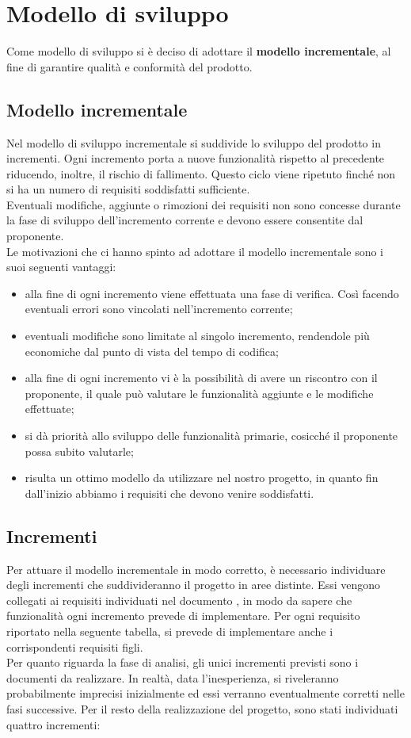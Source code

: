 \section{Modello di sviluppo}
Come modello di sviluppo si è deciso di adottare il \textbf{modello incrementale}, al fine di garantire qualità e conformità del prodotto.

\subsection{Modello incrementale}
Nel modello di sviluppo incrementale si suddivide lo sviluppo del prodotto in incrementi. Ogni incremento porta a nuove funzionalità rispetto al precedente riducendo, inoltre, il rischio di fallimento. Questo ciclo viene ripetuto finché non si ha un numero di requisiti soddisfatti sufficiente.\\
Eventuali modifiche, aggiunte o rimozioni dei requisiti non sono concesse durante la fase di sviluppo dell'incremento corrente e devono essere consentite dal proponente.\\
Le motivazioni che ci hanno spinto ad adottare il modello incrementale sono i suoi seguenti vantaggi:
\begin{itemize}
\item alla fine di ogni incremento viene effettuata una fase di verifica. Così facendo eventuali errori sono vincolati nell'incremento corrente;
\item eventuali modifiche sono limitate al singolo incremento, rendendole più economiche dal punto di vista del tempo di codifica;
\item alla fine di ogni incremento vi è la possibilità di avere un riscontro con il proponente, il quale può valutare le funzionalità aggiunte e le modifiche effettuate;
\item si dà priorità allo sviluppo delle funzionalità primarie, cosicché il proponente possa subito valutarle;
\item risulta un ottimo modello da utilizzare nel nostro progetto, in quanto fin dall'inizio abbiamo i requisiti che devono venire soddisfatti.
\end{itemize}

\subsection{Incrementi}
Per attuare il modello incrementale in modo corretto, è necessario individuare degli incrementi che suddivideranno il progetto in aree distinte. Essi vengono collegati ai requisiti individuati nel documento \AdRv{}, in modo da sapere che funzionalità ogni incremento prevede di implementare. Per ogni requisito riportato nella seguente tabella, si prevede di implementare anche i corrispondenti requisiti figli. \\
Per quanto riguarda la fase di analisi, gli unici incrementi previsti sono i documenti da realizzare. In realtà, data l'inesperienza, si riveleranno probabilmente imprecisi inizialmente ed essi verranno eventualmente corretti nelle fasi successive.
Per il resto della realizzazione del progetto, sono stati individuati quattro incrementi:

